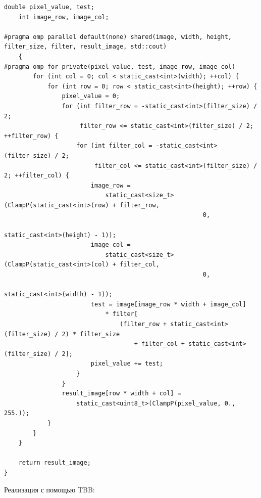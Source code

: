 \documentclass{report}
\begin{document}
\begin{lstlisting}[breaklines=true]
    double pixel_value, test;
    int image_row, image_col;

#pragma omp parallel default(none) shared(image, width, height, filter_size, filter, result_image, std::cout)
    {
#pragma omp for private(pixel_value, test, image_row, image_col)
        for (int col = 0; col < static_cast<int>(width); ++col) {
            for (int row = 0; row < static_cast<int>(height); ++row) {
                pixel_value = 0;
                for (int filter_row = -static_cast<int>(filter_size) / 2;
                     filter_row <= static_cast<int>(filter_size) / 2; ++filter_row) {
                    for (int filter_col = -static_cast<int>(filter_size) / 2;
                         filter_col <= static_cast<int>(filter_size) / 2; ++filter_col) {
                        image_row =
                            static_cast<size_t>(ClampP(static_cast<int>(row) + filter_row,
                                                       0,
                                                       static_cast<int>(height) - 1));
                        image_col =
                            static_cast<size_t>(ClampP(static_cast<int>(col) + filter_col,
                                                       0,
                                                       static_cast<int>(width) - 1));
                        test = image[image_row * width + image_col]
                            * filter[
                                (filter_row + static_cast<int>(filter_size) / 2) * filter_size
                                    + filter_col + static_cast<int>(filter_size) / 2];
                        pixel_value += test;
                    }
                }
                result_image[row * width + col] =
                    static_cast<uint8_t>(ClampP(pixel_value, 0., 255.));
            }
        }
    }

    return result_image;
}

\end{lstlisting}

Реализация с помощью TBB:
\end{document}
